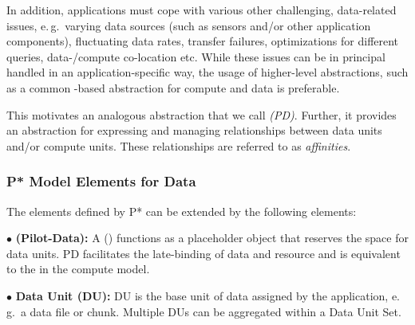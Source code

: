 \documentclass[conference]{IEEEtran}
\begin{document}
In addition, applications must cope with various other challenging,
data-related issues, e.\,g.\ varying data sources (such as sensors
and/or other application components), fluctuating data rates, transfer
failures, optimizations for different queries, data-/compute
co-location etc. While these issues can be in principal handled in an
application-specific way, the usage of higher-level abstractions, such
as a common \pilot-based abstraction for compute and data is
preferable.  


This motivates an analogous abstraction that we call \emph{\pilotdata
  (PD)}.  Further, it provides an abstraction for expressing and
managing relationships between data units and/or compute units. These
relationships are referred to as \emph{affinities}.


\subsubsection*{P* Model Elements for Data}


The elements defined by P* can be extended by the following elements:


\noindent$\bullet$
  \textbf{\pilot (Pilot-Data):} A \pilotdata (\pd) functions as a 
	placeholder object that reserves the space
	for data units. PD facilitates the late-binding of data and resource and is
	equivalent to the \pilot in the compute model.

\noindent$\bullet$
  \textbf{Data Unit (DU):} DU is the base unit of data assigned by
  the application,  e.\,g.\ a data file or chunk. Multiple DUs can be aggregated 
   within a Data Unit Set.

\end{document}
